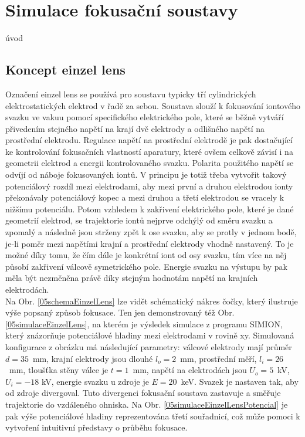 \newpage
\chapter{Simulace fokusační soustavy}

úvod

\section{Koncept einzel lens}

Označení einzel lens se používá pro soustavu typicky tří cylindrických elektrostatických elektrod v řadě za sebou. Soustava slouží k fokusování iontového svazku ve vakuu pomocí specifického elektrického pole, které se běžně vytváří přivedením stejného napětí na krají dvě elektrody a odlišného napětí na prostřední elektrodu. Regulace napětí na prostřední elektrodě je pak dostačující ke kontrolování fokusačních vlastností aparatury, které ovšem celkově závisí i na geometrii elektrod a energii kontrolovaného svazku. Polarita použitého napětí se odvíjí od náboje fokusovaných iontů. V principu je totiž třeba vytvořit takový potenciálový rozdíl mezi elektrodami, aby mezi první a druhou elektrodou ionty překonávaly potenciálový kopec a mezi druhou a třetí elektrodou se vracely k nižšímu potenciálu. Potom vzhledem k zakřivení elektrického pole, které je dané geometrií elektrod, se trajektorie iontů nejprve odchýlý od směru svazku a zpomalý a následně jsou strženy zpět k ose svazku, aby se protly v jednom bodě, je-li poměr mezi napětími krajní a prostřední elektrody vhodně nastavený. To je možné díky tomu, že čím dále je konkrétní iont od osy svazku, tím více na něj působí zakřivení válcově symetrického pole. Energie svazku na výstupu by pak měla být nezměněna právě díky stejným hodnotám napětí na krajních elektrodách.\\

Na Obr. \ref{05schemaEinzelLens} lze vidět schématický nákres čočky, který ilustruje výše popsaný způsob fokusace. Ten jen demonstrovaný též Obr. \ref{05simulaceEinzelLens}, na kterém je výsledek simulace z programu SIMION, který znázorňuje potenciálové hladiny mezi elektrodami v rovině xy. Simulovaná konfigurace z obrázku má následující parametry: válcové elektrody mají průměr $d=35$~mm, krajní elektrody jsou dlouhé $l_o = 2$~mm, prostřední měří, $l_i = 26$~mm, tloušťka stěny válce je $t=1$~mm, napětí na elektrodách jsou $U_o = 5$~kV, $U_i = -18$ kV, energie svazku u zdroje je $E = 20$~keV. Svazek je nastaven tak, aby od zdroje divergoval. Tuto divergenci fokusační soustava zastavuje a směřuje trajektorie do vzdáleného ohniska. Na Obr. \ref{05simulaceEinzelLensPotencial} je pak výše potenciálové hladiny reprezentována třetí souřadnicí, což může pomoci k vytvoření intuitivní představy o průběhu fokusace.\\

